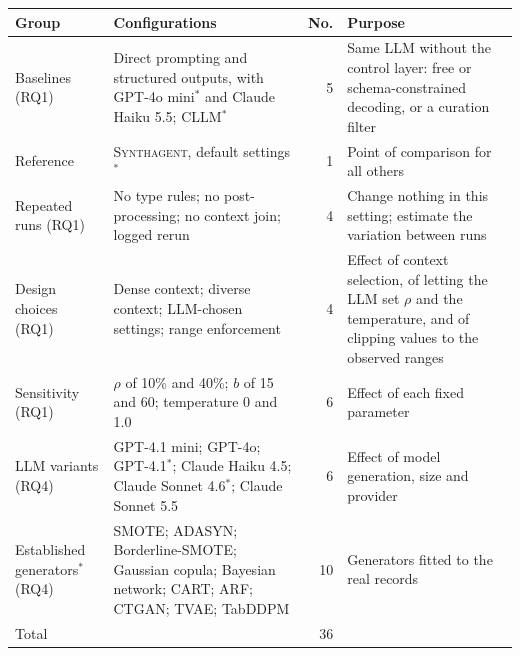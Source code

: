 \documentclass[conference]{IEEEtran}
\newcommand{\system}{\textsc{Synthagent}\xspace}
\providecommand{\DIFaddbeginFL}{} %
\providecommand{\DIFaddendFL}{} %
\providecommand{\DIFdelendFL}{} %
\newcommand{\DIFaddincludegraphics}[2][]{{\color{blue}\fbox{\DIFOincludegraphics[#1]{#2}}}} %
\DeclareRobustCommand{\DIFaddbeginFL}{\DIFOaddbeginFL \let\includegraphics\DIFaddincludegraphics} %
\DeclareRobustCommand{\DIFaddendFL}{\DIFOaddendFL \let\includegraphics\DIFOincludegraphics} %
\DeclareRobustCommand{\DIFdelendFL}{\DIFOaddendFL \let\includegraphics\DIFOincludegraphics} %
\begin{document}
\begin{table}[t]
\DIFdelendFL \DIFaddbeginFL \begin{tabular}{@{}p{}p{}r@{\hspace{4pt}}p{}@{}}
\toprule
Group & Configurations & No. & Purpose \\
\midrule
Baselines (RQ1) & Direct prompting and structured outputs, with GPT-4o mini$^{\ast}$ and Claude Haiku 5.5; CLLM$^{\ast}$ & 5 & Same LLM without the control layer: free or schema-constrained decoding, or a curation filter \\
Reference & \system, default settings$^{\ast}$ & 1 & Point of comparison for all others \\
Repeated runs (RQ1) & No type rules; no post-processing; no context join; logged rerun & 4 & Change nothing in this setting; estimate the variation between runs \\
Design choices (RQ1) & Dense context; diverse context; LLM-chosen settings; range enforcement & 4 & Effect of context selection, of letting the LLM set $\rho$ and the temperature, and of clipping values to the observed ranges \\
Sensitivity (RQ1) & $\rho$ of 10\% and 40\%; $b$ of 15 and 60; temperature 0 and 1.0 & 6 & Effect of each fixed parameter \\
LLM variants (RQ4) & GPT-4.1 mini; GPT-4o; GPT-4.1$^{\ast}$; Claude Haiku 4.5; Claude Sonnet 4.6$^{\ast}$; Claude Sonnet 5.5 & 6 & Effect of model generation, size and provider \\
Established generators$^{\ast}$ (RQ4) & SMOTE; ADASYN; Borderline-SMOTE; Gaussian copula; Bayesian network; CART; ARF; CTGAN; TVAE; TabDDPM & 10 & Generators fitted to the real records \\
\midrule
Total & & 36 & \\
\bottomrule
\end{tabular}
\DIFaddendFL \end{table}
\end{document}
